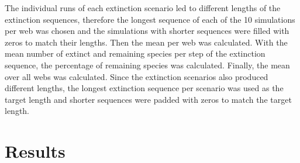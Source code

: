 \documentclass[12pt,a4paper]{article}
\begin{document}
\begin{table}[H]
\centering
\caption{\textbf{Overview of extinction models} If community variables were set to low or high contribution to determine species interactions (see \ref{sec:net_sim} for details) one model with each setting was simulated. For trophic levels either the higher or lower level was chosen and extinctions were simulated. In the 'Trophic' model either the lower or higher trophic level was chosen randomly each extinction step and a species was removed. Except for the 'Abundance' model, the species that was removed was chosen at random. For the 'Abundance' model the species with the lowest abundance was removed sequentially. Each model was run with and without rewiring.}
\label{tab:models}
\end{table}
 
 
	The individual runs of each extinction scenario led to different lengths of the extinction sequences, therefore the longest sequence of each of the 10 simulations per web was chosen and the simulations with shorter sequences were filled with zeros to match their lengths. Then the mean per web was calculated.
	With the mean number of extinct and remaining species per step of the extinction sequence, the percentage of remaining species was calculated.
	Finally, the mean over all webs was calculated. Since the extinction scenarios also produced different lengths, the longest extinction sequence per scenario was used as the target length and shorter sequences were padded with zeros to match the target length.
\section{Results}
\end{document}
